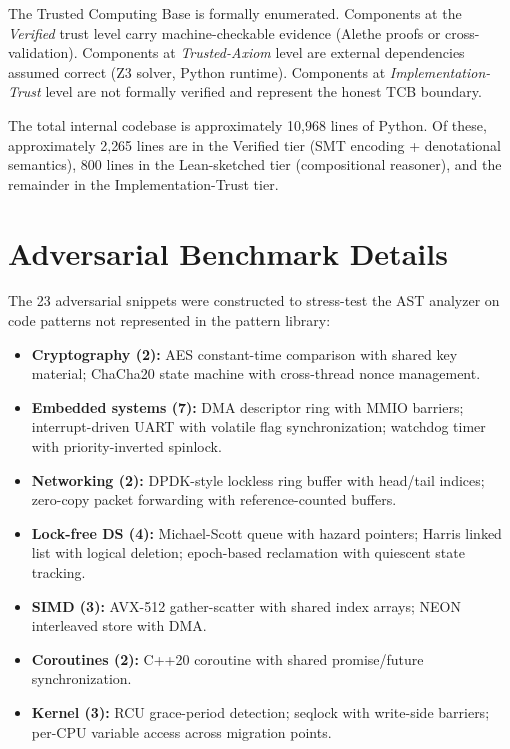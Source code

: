 \documentclass[11pt]{article}
\begin{document}
The Trusted Computing Base is formally enumerated.  Components at
the \emph{Verified} trust level carry machine-checkable evidence
(Alethe proofs or cross-validation).  Components at
\emph{Trusted-Axiom} level are external dependencies assumed correct
(Z3 solver, Python runtime).  Components at
\emph{Implementation-Trust} level are not formally verified and
represent the honest TCB boundary.

The total internal codebase is approximately 10{,}968 lines of Python.
Of these, approximately 2{,}265 lines are in the Verified tier
(SMT encoding + denotational semantics), 800 lines in the
Lean-sketched tier (compositional reasoner), and the remainder
in the Implementation-Trust tier.

\section{Adversarial Benchmark Details}
\label{app:adversarial-details}

The 23 adversarial snippets were constructed to stress-test the
AST analyzer on code patterns not represented in the pattern library:

\begin{itemize}[nosep]
\item \textbf{Cryptography (2):} AES constant-time comparison with
  shared key material; ChaCha20 state machine with cross-thread
  nonce management.
\item \textbf{Embedded systems (7):} DMA descriptor ring with
  MMIO barriers; interrupt-driven UART with volatile flag
  synchronization; watchdog timer with priority-inverted spinlock.
\item \textbf{Networking (2):} DPDK-style lockless ring buffer
  with head/tail indices; zero-copy packet forwarding with
  reference-counted buffers.
\item \textbf{Lock-free DS (4):} Michael-Scott queue with
  hazard pointers; Harris linked list with logical deletion;
  epoch-based reclamation with quiescent state tracking.
\item \textbf{SIMD (3):} AVX-512 gather-scatter with shared
  index arrays; NEON interleaved store with DMA.
\item \textbf{Coroutines (2):} C++20 coroutine with shared
  promise/future synchronization.
\item \textbf{Kernel (3):} RCU grace-period detection; seqlock
  with write-side barriers; per-CPU variable access across
  migration points.
\end{itemize}
\end{document}
